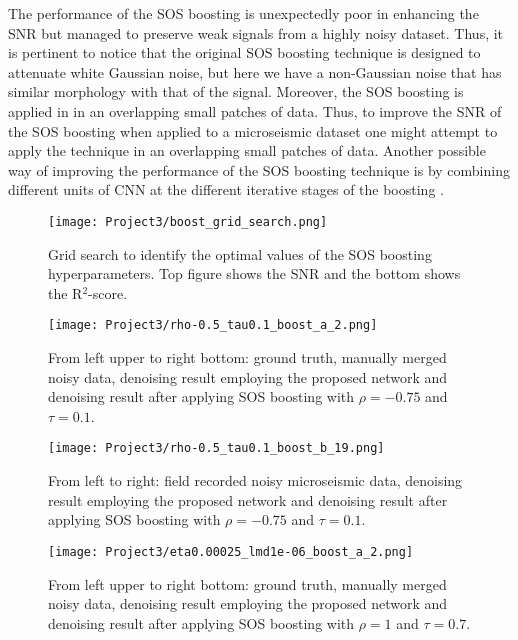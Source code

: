 \documentclass[a4paper]{article}
\begin{document}
The performance of the SOS boosting is unexpectedly poor in enhancing the SNR but managed to preserve weak signals from a highly noisy dataset. Thus, it is pertinent to notice that the original SOS boosting technique is designed to attenuate white Gaussian noise, but here we have a non-Gaussian noise that has similar morphology with that of the signal. Moreover, the SOS boosting is applied in \cite{RomanoE15} in an overlapping small patches of data. Thus, to improve the SNR of the SOS boosting when applied to a microseismic dataset one might attempt to apply the technique in an overlapping small patches of data. Another possible way of improving the performance of the SOS boosting technique is by combining different units of CNN at the different iterative stages of the boosting \cite{ChenXTW18}.

\begin{figure}[H]
  \centering
  \texttt{[image: Project3/boost\_grid\_search.png]}
  \caption{Grid search to identify the optimal values of the SOS boosting hyperparameters. Top figure shows the SNR and the bottom shows the R$^2$-score.}
    \label{boost_grid}
\end{figure}


\begin{figure}[H]
  \centering
  \texttt{[image: Project3/rho-0.5\_tau0.1\_boost\_a\_2.png]}
  \caption{From left upper to right bottom: ground truth, manually merged noisy data, denoising result employing the proposed network and denoising result after applying SOS boosting with $\rho=-0.75$ and $\tau=0.1$.}
    \label{boosta1}
\end{figure}

\begin{figure}[H]
  \centering
  \texttt{[image: Project3/rho-0.5\_tau0.1\_boost\_b\_19.png]}
  \caption{From left to right: field recorded noisy microseismic data, denoising result employing the proposed network and denoising result after applying SOS boosting with $\rho=-0.75$ and $\tau=0.1$.}
    \label{boostb1}
\end{figure}

\begin{figure}[H]
  \centering
  \texttt{[image: Project3/eta0.00025\_lmd1e-06\_boost\_a\_2.png]}
  \caption{From left upper to right bottom: ground truth, manually merged noisy data, denoising result employing the proposed network and denoising result after applying SOS boosting with $\rho=1$ and $\tau=0.7$.}
    \label{boosta2}
\end{figure}
\end{document}
